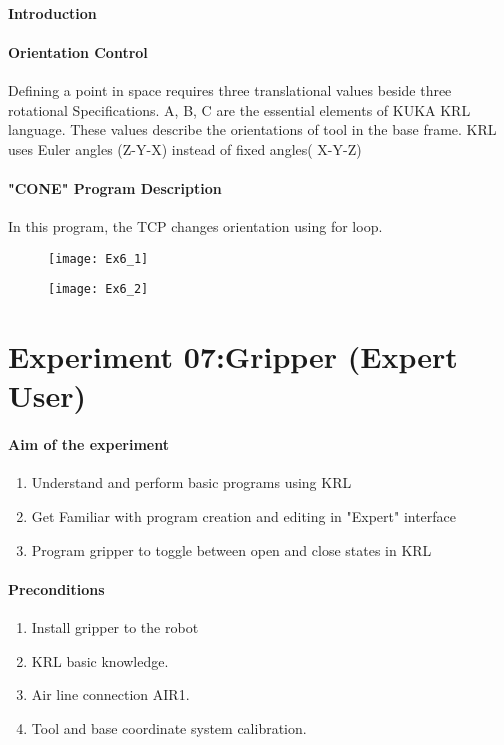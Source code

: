 \paragraph{Introduction}
\paragraph{Orientation Control}
Defining a point in space requires three translational values beside three rotational Specifications.
A, B, C are the essential elements of KUKA KRL language. These values describe the orientations of tool in the base frame. KRL uses Euler angles (Z-Y-X) instead of fixed angles( X-Y-Z)
\paragraph{"CONE" Program Description}
In this program, the TCP changes orientation using for loop. 
\begin{figure}[H]
	\centering
	\texttt{[image: Ex6\_1]}
\end{figure}
\begin{figure}[H]
	\centering
	\texttt{[image: Ex6\_2]}
\end{figure}
\section{Experiment 07:Gripper (Expert User)}
\paragraph{Aim of the experiment}
\begin{enumerate}
	\item  Understand and perform basic programs using KRL
	\item  Get Familiar with program creation and editing in "Expert" interface
	\item  Program gripper to toggle between open and close states in KRL
\end{enumerate}
\paragraph{Preconditions}
\begin{enumerate}
	\item Install gripper to the robot
	\item  KRL basic knowledge.
	\item  Air line connection AIR1. 
	\item  Tool and base coordinate system calibration.
\end{enumerate}
\newpage
